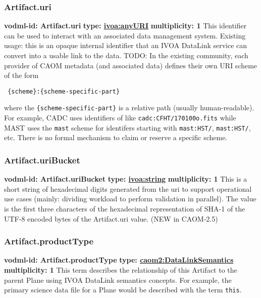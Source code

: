     \subsubsection{Artifact.uri}
      \textbf{vodml-id: Artifact.uri} \newline
      \textbf{type: \hyperref[sect:ivoa]{ivoa:anyURI}} \newline
      \textbf{multiplicity: 1} \newline
      This identifier can be used to interact with an associated data management system. Existing usage: this is an opaque internal identifier that an IVOA DataLink service can convert into a usable link to the data. TODO: In the existing community, each provider of CAOM metadata (and associated data) defines their own URI scheme of the form \begin{verbatim} {scheme}:{scheme-specific-part} \end{verbatim} where the \verb|{scheme-specific-part}| is a relative path (usually human-readable). For example, CADC uses identifiers of like \verb|cadc:CFHT/170100o.fits| while MAST uses the \verb|mast| scheme for identifers starting with \verb|mast:HST/|, \verb|mast:HST/|, etc. There is no formal mechanism to claim or reserve a specific scheme.

    \subsubsection{Artifact.uriBucket}
      \textbf{vodml-id: Artifact.uriBucket} \newline
      \textbf{type: \hyperref[sect:ivoa]{ivoa:string}} \newline
      \textbf{multiplicity: 1} \newline
      This is a short string of hexadecimal digits generated from the uri to support operational use cases (mainly: dividing workload to perform validation in parallel). The value is the first three characters of the hexadecimal representation of SHA-1 of the UTF-8 encoded bytes of the Artifact.uri value. (NEW in CAOM-2.5)

    \subsubsection{Artifact.productType}
      \textbf{vodml-id: Artifact.productType} \newline
      \textbf{type: \hyperref[sect:DataLinkSemantics]{caom2:DataLinkSemantics}} \newline
      \textbf{multiplicity: 1} \newline
      This term describes the relationship of this Artifact to the parent Plane using IVOA DataLink semantics concepts. For example, the primary science data file for a Plane would be described with the term \verb|this|.

